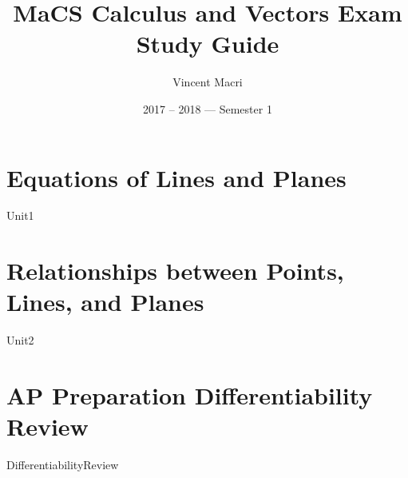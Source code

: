 \documentclass[letterpaper,12pt]{report}
\title{MaCS Calculus and Vectors Exam Study Guide}
\author{Vincent Macri}
\date{2017 -- 2018 --- Semester 1}
\begin{document}
	\maketitle
	\clearpage
	\tableofcontents
	\clearpage

	\part{Equations of Lines and Planes}
		{Unit1}
	\part{Relationships between Points, Lines, and Planes}
		{Unit2}
	\part*{AP Preparation Differentiability Review}
		\setcounter{section}{3}
		{DifferentiabilityReview}
	
\end{document}
